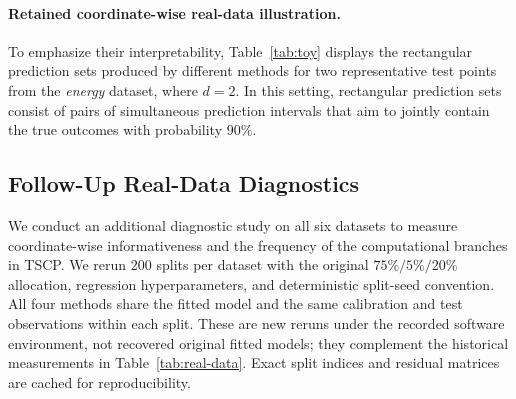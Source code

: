 \paragraph{Retained coordinate-wise real-data illustration.}
To emphasize their interpretability, Table~\ref{tab:toy} displays the rectangular prediction sets produced by different methods for two representative test points from the \emph{energy} dataset, where $d=2$. In this setting, rectangular prediction sets consist of pairs of simultaneous prediction intervals that aim to jointly contain the true outcomes with probability $90\%$.

\begin{table}[!htbp]

\caption{Anecdotal illustration of conformal prediction sets of rectangular shape for two test points from the \emph{energy} dataset. In this case, the prediction sets can be reported as pairs of joint prediction intervals for the two outcome dimensions. Volumes are computed in residual space. Intervals that fail to cover the corresponding true outcomes are highlighted in \textcolor{red}{red}; smallest interval that covers the ground truth is highlighted in \textbf{bold}. This example is included for illustration only: the coverage guarantees of conformal prediction hold on average, not for individual test points.}
\label{tab:toy}
\end{table}

\FloatBarrier
\subsection{Follow-Up Real-Data Diagnostics}
\label{sec:real-data-diagnostics}

We conduct an additional diagnostic study on all six datasets to measure
coordinate-wise informativeness and the frequency of the computational
branches in TSCP. We rerun 200 splits per dataset with the original
$75\%/5\%/20\%$ allocation, regression hyperparameters, and deterministic
split-seed convention. All four methods share the fitted model and the same
calibration and test observations within each split. These are new reruns
under the recorded software environment, not recovered original fitted
models; they complement the historical measurements in
Table~\ref{tab:real-data}. Exact split indices and residual matrices are
cached for reproducibility.

